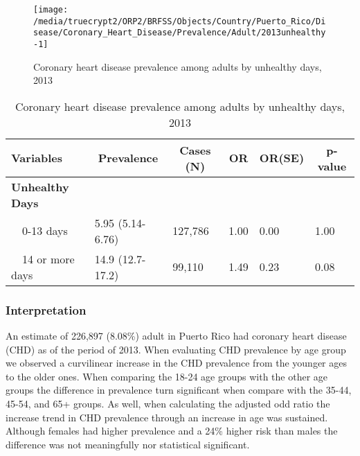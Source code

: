 \begin{figure}[H]
\caption{Coronary heart disease prevalence among adults by unhealthy days, 2013}
\label{fig:unhlthy.Coronary_Heart_Disease.2013}

\begin{knitrout}
\color{fgcolor}

{\centering \texttt{[image: /media/truecrypt2/ORP2/BRFSS/Objects/Country/Puerto\_Rico/Disease/Coronary\_Heart\_Disease/Prevalence/Adult/2013unhealthy-1]} 

}



\end{knitrout}
\end{figure}

\begin{table}[H]
\caption{Coronary heart disease prevalence among adults by unhealthy days, 2013\label{tab:unhlthy.Coronary_Heart_Disease.2013}} 
\begin{center}
\begin{tabular}{llllll}
\hline\hline
\multicolumn{1}{l}{Variables}&\multicolumn{1}{c}{Prevalence}&\multicolumn{1}{c}{Cases (N)}&\multicolumn{1}{c}{OR}&\multicolumn{1}{c}{OR(SE)}&\multicolumn{1}{c}{p-value}\tabularnewline
\hline
{\bfseries Unhealthy Days}&&&&&\tabularnewline
~~0-13 days&5.95 (5.14-6.76)&127,786&1.00&0.00&1.00\tabularnewline
~~14 or more days&14.9 (12.7-17.2)& 99,110&1.49&0.23&0.08\tabularnewline
\hline
\end{tabular}\end{center}

\end{table}

\newpage
\subsubsection{Interpretation}

An estimate of 226,897 (8.08\%) adult in Puerto Rico had coronary heart disease (CHD) as of the period of 2013. When evaluating CHD prevalence by age group we observed a curvilinear increase in the CHD prevalence from the younger ages to the older ones.  When comparing the 18-24 age groups with the other age groups the difference in prevalence turn significant when compare with the 35-44, 45-54, and 65+ groups. As well, when calculating the adjusted odd ratio the increase trend in CHD prevalence through an increase in age was sustained.
Although females had higher prevalence and a 24\% higher risk than males the difference was not meaningfully nor statistical significant.

